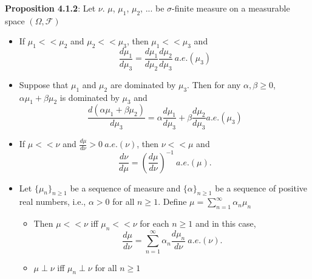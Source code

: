 \documentclass[12pt,letterpaper, onecolumn]{exam}
\newcommand{\calF}{\mathcal{F}}
\newcommand{\cutesum}[1]{\sum_{#1 = 1}^\infty}
\begin{document}
\begin{questions}
    \textbf{Proposition 4.1.2}: Let $\nu$. $\mu$, $\mu_1$, $\mu_2$, ... be $\sigma$-finite measure on a measurable space $(\Omega, \calF)$
    \begin{itemize}
        \item[(i)] If $\mu_1 << \mu_2$ and $\mu_2 << \mu_3$, then $\mu_1 << \mu_3$ and
        \[\frac{d \mu_1}{d \mu_3} = \frac{d \mu_1}{d \mu_2}\frac{d \mu_2}{d \mu_3} \: a.e.(\mu_3)\]
        \item[(ii)] Suppose that $\mu_1$ and $\mu_2$ are dominated by $\mu_3$. Then for any $\alpha, \beta \geq 0$, $\alpha \mu_1 + \beta \mu_2$ is dominated by $\mu_3$ and 
        \[\frac{d(\alpha \mu_1 + \beta \mu_2)}{d \mu_3} = \alpha \frac{d \mu_1}{d \mu_3} + \beta \frac{d \mu_2}{d \mu_3} a.e.(\mu_3)\]
        \item[(iii)] If $\mu << \nu$ and $\frac{d \mu}{d \nu} > 0 \: a.e.(\nu)$, then $\nu << \mu$ and 
        \[\frac{d \nu}{d \mu} = \left(\frac{d \mu}{d \nu}\right)^{-1} \: a.e.(\mu).\]
        \item[(iv)] Let $\{\mu_n\}_{n \geq 1}$ be a sequence of measure and $\{\alpha\}_{n \geq 1}$ be a sequence of positive real numbers, i.e., $\alpha > 0$ for all $n \geq 1$. Define $\mu = \cutesum{n} \alpha_n \mu_n$
        \begin{itemize}
            \item[(a)] Then $\mu << \nu$ iff $\mu_n << \nu$ for each $n \geq 1$ and in this case, 
            \[\frac{d \mu}{d \nu} = \cutesum{n}\alpha_n \frac{d \mu_n}{d \nu} \: a.e.(\nu).\]
            \item[(b)] $\mu \perp \nu$ iff $\mu_n \perp \nu$ for all $n \geq 1$ 
        \end{itemize}
    \end{itemize}
    

\end{questions}
\end{document}
